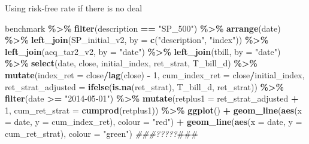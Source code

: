 \documentclass[
]{article}
\newenvironment{Shaded}{\begin{snugshade}}{\end{snugshade}}
\newcommand{\AlertTok}[1]{\textcolor[rgb]{0.94,0.16,0.16}{#1}}
\newcommand{\CommentTok}[1]{\textcolor[rgb]{0.56,0.35,0.01}{\textit{#1}}}
\newcommand{\DataTypeTok}[1]{\textcolor[rgb]{0.13,0.29,0.53}{#1}}
\newcommand{\DecValTok}[1]{\textcolor[rgb]{0.00,0.00,0.81}{#1}}
\newcommand{\KeywordTok}[1]{\textcolor[rgb]{0.13,0.29,0.53}{\textbf{#1}}}
\newcommand{\NormalTok}[1]{#1}
\newcommand{\OperatorTok}[1]{\textcolor[rgb]{0.81,0.36,0.00}{\textbf{#1}}}
\newcommand{\StringTok}[1]{\textcolor[rgb]{0.31,0.60,0.02}{#1}}
\begin{document}
Using risk-free rate if there is no deal

\begin{Shaded}
\begin{Highlighting}[]
\NormalTok{benchmark }\OperatorTok{\%\textgreater{}\%}
\StringTok{  }\KeywordTok{filter}\NormalTok{(description }\OperatorTok{==}\StringTok{ "SP\_500"}\NormalTok{) }\OperatorTok{\%\textgreater{}\%}
\StringTok{  }\KeywordTok{arrange}\NormalTok{(date) }\OperatorTok{\%\textgreater{}\%}
\StringTok{  }\KeywordTok{left\_join}\NormalTok{(SP\_initial\_v2, }\DataTypeTok{by =} \KeywordTok{c}\NormalTok{(}\StringTok{"description"}\NormalTok{, }\StringTok{"index"}\NormalTok{)) }\OperatorTok{\%\textgreater{}\%}
\StringTok{  }\KeywordTok{left\_join}\NormalTok{(acq\_tar2\_v2, }\DataTypeTok{by =} \StringTok{"date"}\NormalTok{) }\OperatorTok{\%\textgreater{}\%}
\StringTok{  }\KeywordTok{left\_join}\NormalTok{(tbill, }\DataTypeTok{by =} \StringTok{"date"}\NormalTok{) }\OperatorTok{\%\textgreater{}\%}
\StringTok{  }\KeywordTok{select}\NormalTok{(date, close, initial\_index, ret\_strat, T\_bill\_d) }\OperatorTok{\%\textgreater{}\%}
\StringTok{  }\KeywordTok{mutate}\NormalTok{(}\DataTypeTok{index\_ret =}\NormalTok{ close}\OperatorTok{/}\KeywordTok{lag}\NormalTok{(close) }\OperatorTok{{-}}\StringTok{ }\DecValTok{1}\NormalTok{,}
         \DataTypeTok{cum\_index\_ret =}\NormalTok{ close}\OperatorTok{/}\NormalTok{initial\_index,}
         \DataTypeTok{ret\_strat\_adjusted =} \KeywordTok{ifelse}\NormalTok{(}\KeywordTok{is.na}\NormalTok{(ret\_strat), T\_bill\_d, ret\_strat)) }\OperatorTok{\%\textgreater{}\%}
\StringTok{  }\KeywordTok{filter}\NormalTok{(date }\OperatorTok{\textgreater{}=}\StringTok{ "2014{-}05{-}01"}\NormalTok{) }\OperatorTok{\%\textgreater{}\%}
\StringTok{  }\KeywordTok{mutate}\NormalTok{(}\DataTypeTok{retplus1 =}\NormalTok{ ret\_strat\_adjusted }\OperatorTok{+}\StringTok{ }\DecValTok{1}\NormalTok{,}
    \DataTypeTok{cum\_ret\_strat =} \KeywordTok{cumprod}\NormalTok{(retplus1)) }\OperatorTok{\%\textgreater{}\%}
\StringTok{  }\KeywordTok{ggplot}\NormalTok{() }\OperatorTok{+}
\StringTok{  }\KeywordTok{geom\_line}\NormalTok{(}\KeywordTok{aes}\NormalTok{(}\DataTypeTok{x =}\NormalTok{ date, }\DataTypeTok{y =}\NormalTok{ cum\_index\_ret), }\DataTypeTok{colour =} \StringTok{"red"}\NormalTok{) }\OperatorTok{+}
\StringTok{  }\KeywordTok{geom\_line}\NormalTok{(}\KeywordTok{aes}\NormalTok{(}\DataTypeTok{x =}\NormalTok{ date, }\DataTypeTok{y =}\NormalTok{ cum\_ret\_strat), }\DataTypeTok{colour =} \StringTok{"green"}\NormalTok{) }\CommentTok{\#\#\#?????}\AlertTok{\#\#\#}\CommentTok{ }
\end{Highlighting}
\end{Shaded}
\end{document}
